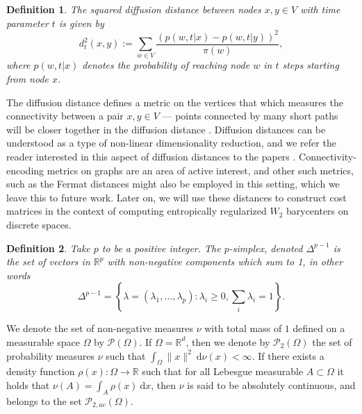 \documentclass{article}
\newtheorem{definition}{Definition}
\newcommand{\R}{\mathbb{R}}
\newcommand{\diff}{\:\mathrm{d}}
\begin{document}
\begin{definition}
  The squared \emph{diffusion distance} between nodes \(x,y \in V\) with time parameter \(t\) is given by
\[d_t^2(x,y) := \sum\limits_{w \in V}\frac{(p(w,t|x) - p(w,t|y))^2}{\pi(w)},\]
where \(p(w,t|x)\) denotes the probability of reaching node \(w\) in \(t\) steps starting from node \(x\).
\end{definition}
The diffusion distance defines a metric on the vertices that which measures the connectivity between a pair \(x,y \in V\) --- points connected by many short paths will be closer together in the diffusion distance \cite{coifmanGeometricDiffusionsTool2005, coifmanDiffusionMaps2006}.  Diffusion distances can be understood as a type of non-linear dimensionality reduction, and we refer the reader interested in this aspect of diffusion distances to the papers \cite{maggioni2019learning, tenenbaumGlobalGeometricFramework2000, roweisNonlinearDimensionalityReduction2000, belkinLaplacianEigenmapsDimensionality2003}. Connectivity-encoding metrics on graphs are an area of active interest, and other such metrics, such as the Fermat distances \cite{bijralSemisupervisedLearningDensity2011, mckenzie2019power, little2022balancing, chazalchoosing, trillosFermatDistancesMetric2024} might also be employed in this setting, which we leave this to future work. Later on, we will use these distances to construct cost matrices in the context of computing entropically regularized \(W_2\) barycenters on discrete spaces.

\begin{definition}
  Take \(p\) to be a positive integer. The \emph{\(p\)-simplex}, denoted \(\Delta^{p-1}\) is the set of vectors in \(\R^p\) with non-negative components which sum to 1, in other words
  \begin{equation*}
   \Delta^{p-1} = \left\{\lambda = (\lambda_1, \dots, \lambda_p) : \lambda_i \ge 0, \sum_i \lambda_i = 1\right\} .
  \end{equation*}
\end{definition}

We denote the set of non-negative measures \(\nu\) with total mass of \(1\) defined on a measurable space \(\Omega\) by \(\mathcal{P}(\Omega)\). If \(\Omega = \R^d\), then we denote by \(\mathcal{P}_{2}(\Omega)\) the set of probability measures \(\nu\) such that \(\int_\Omega \|x\|^2\diff\nu(x) < \infty\). If there exists a density function \(\rho(x): \Omega \to \R\) such that for all Lebesgue measurable \(A \subset \Omega\) it holds that \(\nu(A) = \int_A\rho(x)\diff x\), then \(\nu\) is said to be absolutely continuous, and belongs to the set \(\mathcal{P}_{2,ac}(\Omega).\)
\end{document}
